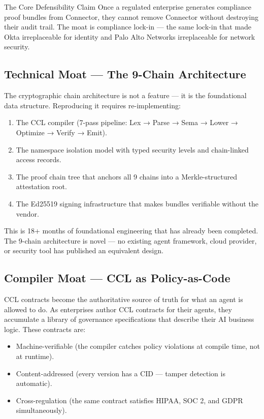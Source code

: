 \documentclass[11pt,a4paper]{article}
\begin{document}
\begin{warnbox}{The Core Defensibility Claim}
Once a regulated enterprise generates compliance proof bundles from Connector, they cannot
remove Connector without destroying their audit trail. The moat is compliance lock-in —
the same lock-in that made Okta irreplaceable for identity and Palo Alto Networks
irreplaceable for network security.
\end{warnbox}

\subsection{Technical Moat — The 9-Chain Architecture}

The cryptographic chain architecture is not a feature — it is the foundational data structure.
Reproducing it requires re-implementing:

\begin{enumerate}
  \item The CCL compiler (7-pass pipeline: Lex → Parse → Sema → Lower → Optimize → Verify → Emit).
  \item The namespace isolation model with typed security levels and chain-linked access records.
  \item The proof chain tree that anchors all 9 chains into a Merkle-structured attestation root.
  \item The Ed25519 signing infrastructure that makes bundles verifiable without the vendor.
\end{enumerate}

This is 18+ months of foundational engineering that has already been completed. The 9-chain
architecture is novel — no existing agent framework, cloud provider, or security tool has published
an equivalent design.

\subsection{Compiler Moat — CCL as Policy-as-Code}

CCL contracts become the authoritative source of truth for what an agent is allowed to do.
As enterprises author CCL contracts for their agents, they accumulate a library of governance
specifications that describe their AI business logic. These contracts are:

\begin{itemize}
  \item Machine-verifiable (the compiler catches policy violations at compile time, not at runtime).
  \item Content-addressed (every version has a CID — tamper detection is automatic).
  \item Cross-regulation (the same contract satisfies HIPAA, SOC 2, and GDPR simultaneously).
\end{itemize}
\end{document}
